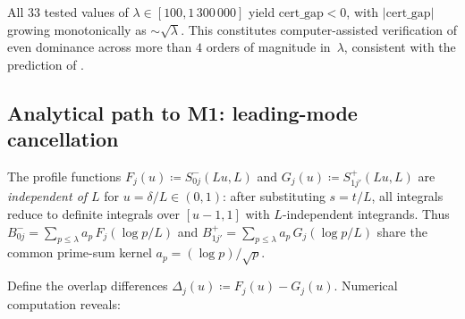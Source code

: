 \documentclass[12pt,a4paper]{article}
\theoremstyle{definition}
\theoremstyle{remark}
\begin{document}
\noindent All $33$ tested values of $\lambda \in [100, 1\,300\,000]$ yield $\mathrm{cert\_gap} < 0$, with $|\mathrm{cert\_gap}|$ growing monotonically as $\sim\!\sqrt{\lambda}$. This constitutes computer-assisted verification of even dominance across more than $4$ orders of magnitude in~$\lambda$, consistent with the prediction of .

\subsection{Analytical path to M1: leading-mode cancellation}
\label{sec:leading-mode}

The profile functions $F_j(u) \coloneqq S^-_{0j}(Lu, L)$ and $G_j(u) \coloneqq S^+_{1j'}(Lu, L)$ are \emph{independent of $L$} for $u = \delta/L \in (0,1)$: after substituting $s = t/L$, all integrals reduce to definite integrals over $[u-1, 1]$ with $L$-independent integrands. Thus $B_{0j}^- = \sum_{p \leq \lambda} a_p\, F_j(\log p/L)$ and $B_{1j'}^+ = \sum_{p \leq \lambda} a_p\, G_j(\log p/L)$ share the common prime-sum kernel $a_p = (\log p)/\sqrt{p}$.

Define the overlap differences $\Delta_j(u) \coloneqq F_j(u) - G_j(u)$. Numerical computation reveals:
\end{document}
